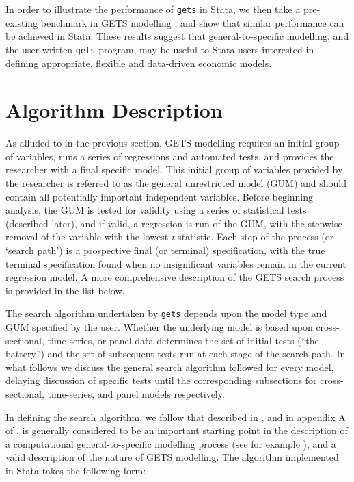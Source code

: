 \documentclass[bib]{statapress}
\begin{document}
In order to illustrate the performance of \texttt{gets} in Stata, we then take 
a pre-existing benchmark in GETS modelling \citep{HooverPerez1999}, and show 
that similar performance can be achieved in Stata.  These results suggest that 
general-to-specific modelling, and the user-written \texttt{gets} program, 
may be useful to Stata users interested in defining appropriate, flexible and 
data-driven economic models.

\section{Algorithm Description}
\label{scn:algorithm}
As alluded to in the previous section, GETS modelling requires an initial group
of variables, runs a series of regressions and automated tests, and provides 
the researcher with a final specific model.  This initial group of variables
provided by the researcher is referred to as the general unrestricted model 
(GUM) and should contain all potentially important independent variables. 
Before beginning analysis, the GUM is tested for validity using a series of 
statistical tests (described later), and if valid, a regression is run of the 
GUM, with the stepwise removal of the variable with the lowest 
\emph{t}-statistic.  Each step of the process (or `search path') is a 
prospective final (or terminal) specification, with the true terminal 
specification found when no insignificant variables remain in the current 
regression model.  A more comprehensive description of the GETS search process
is provided in the list below.

The search algorithm undertaken by \texttt{gets} depends upon the model type 
and GUM specified by the user.  Whether the underlying model is based upon 
cross-sectional, time-series, or panel data determines the set of initial tests 
(``the battery'') and the set of subsequent tests run at each stage of the 
search path.  In what follows we discuss the general search algorithm followed 
for every model, delaying discussion of specific tests until the corresponding 
subsections for cross-sectional, time-series, and panel models respectively.

In defining the search algorithm, we follow that described in 
\citet{HooverPerez1999}, and in appendix A of \citet{HooverPerez2004}.  
\citet{HooverPerez1999} is generally considered to be an important starting 
point in the description of a computational general-to-specific modelling 
process (see for example \citet{Camposetal2005}), and a valid description of 
the nature of GETS modelling.  The algorithm implemented in Stata takes the 
following form:
\end{document}
